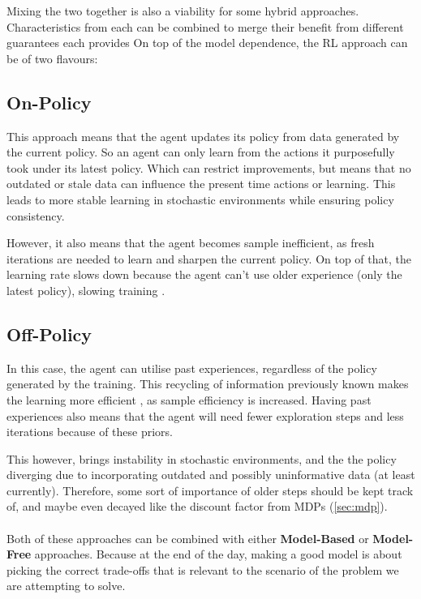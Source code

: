   Mixing the two together is also a viability for some hybrid approaches. Characteristics from each can be combined to merge their benefit from different guarantees each provides \cite{qu2020combiningmodelbasedmodelfreemethods}
  On top of the model dependence, the RL approach can be of two flavours:

  \subsection{On-Policy}
  This approach means that the agent updates its policy from data generated by the current policy. So an agent can only learn from the actions it purposefully took under its latest policy. Which can restrict improvements, but means that no outdated or stale data can influence the present time actions or learning.
  This leads to more stable learning in stochastic environments  while ensuring policy consistency.

  However, it also means that the agent becomes sample inefficient, as fresh iterations are needed to learn and sharpen the current policy. On top of that, the learning rate slows down because the agent can't use older experience (only the latest policy), slowing training \cite{andrychowicz2020onpolicyRL}.

  \subsection{Off-Policy}
  In this case, the agent can utilise past experiences, regardless of the policy generated by the training. This recycling of information previously known makes the learning more efficient \cite{uehara2022reviewoffpolicyevaluationreinforcement}, as sample efficiency is increased.
  Having past experiences also means that the agent will need fewer exploration steps and less iterations because of these priors.
  
  This however, brings instability in stochastic environments, and the the policy diverging due to incorporating outdated and possibly uninformative data (at least currently). Therefore, some sort of importance of older steps should be kept track of, and maybe even decayed like the discount factor from MDPs (\ref{sec:mdp}). \cite{maroti2019rbed} 
  \\\\
  Both of these approaches can be combined with either \textbf{Model-Based} or \textbf{Model-Free} approaches. Because at the end of the day, making a good model is about picking the correct trade-offs that is relevant to the scenario of the problem we are attempting to solve.
